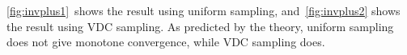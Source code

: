\cref{fig:invplus1}~shows the result using uniform sampling,
and~\cref{fig:invplus2} shows the result using VDC sampling.
As predicted by the theory, uniform sampling does not give monotone
convergence, while VDC sampling does.
\begin{center}
  \begin{figure}[t]
    \begin{centering}
\end{centering}
\end{figure}
\end{center}
